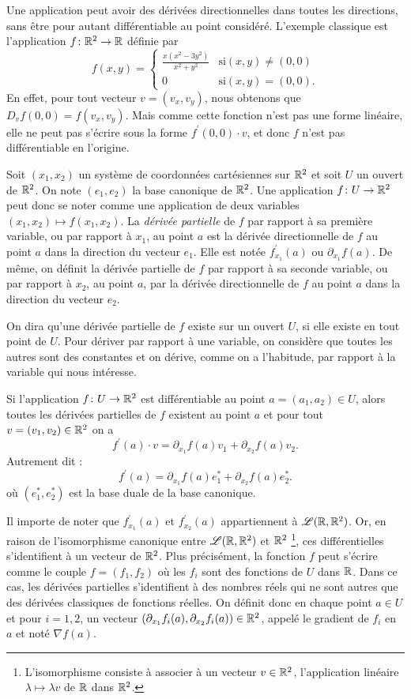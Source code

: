 Une application peut avoir des dérivées directionnelles dans toutes les directions, sans être pour autant différentiable au point considéré. L'exemple classique est l'application $f \colon \mathbb R^2 \to \mathbb R$ définie par
\[f(x,y) = \begin{cases} \frac{x(x^2-3 y^2)}{x^2 + y^2} & \text{si} (x,y) \neq (0,0) \\
0 &  \text{si} (x,y)= (0,0).
\end{cases}\]
En effet, pour tout vecteur $v=(v_x, v_y)$, nous obtenons que $D_v f(0,0) = f(v_x,v_y)$. Mais comme cette fonction n'est pas une forme linéaire, elle ne peut pas s'écrire sous la forme $f^\prime(0,0) \cdot v$, et donc $f$ n'est pas différentiable en l'origine. 

Soit $(x_1,x_2)$ un système de coordonnées cartésiennes sur $\mathbb R^2$ et soit $U$ un ouvert de $\mathbb R^2$. On note $(e_1, e_2)$ la base canonique de $\mathbb R^2$. Une application $f \colon U \to \mathbb R^2$ peut donc se noter comme une application de deux variables $(x_1,x_2) \mapsto f(x_1,x_2)$. La \textit{dérivée partielle} de $f$ par rapport à sa première variable, ou par rapport à $x_1$, au point $a$ est la dérivée directionnelle de $f$ au point $a$ dans la direction du vecteur $e_1$. Elle est notée  $f^\prime_{x_1} (a)$ ou $\partial_{x_1} f (a)$. De même, on définit la dérivée partielle de $f$ par rapport à sa seconde variable, ou par rapport à $x_2$, au point $a$, par la dérivée directionnelle de $f$ au point $a$ dans la direction du vecteur $e_2$. 

On dira qu'une dérivée partielle de $f$ existe sur un ouvert $U$, si elle existe en tout point de $U$. Pour dériver par rapport à une variable, on considère que toutes les autres sont des constantes et on dérive, comme on a l'habitude, par rapport à la variable qui nous intéresse.

\begin{prop}
Si l'application $f \colon U \to \mathbb R^2$ est différentiable au point $a=(a_1,a_2) \in U$, alors toutes les dérivées partielles de $f$ existent au point $a$ et pour tout $v = (v_1,v_2) \in \mathbb R^2$ on a
\[f^\prime (a) \cdot v = \partial_{x_1}f(a) v_1 + \partial_{x_2}f(a)v_2.\]
Autrement dit :
\[f^\prime (a) = \partial_{x_1}f(a) e^\ast_1 + \partial_{x_2}f(a)e^\ast_2.\]
où $(e_1^\ast, e_2^\ast)$ est la base duale de la base canonique. 
\end{prop}

Il importe de noter que $f^\prime_{x_1} (a)$ et $f^\prime_{x_2} (a)$ appartiennent à $\mathcal{L}(\mathbb R, \mathbb R^2)$. Or, en raison de l'isomorphisme canonique entre $\mathcal{L}(\mathbb R, \mathbb R^2)$ et $\mathbb R^2$ \footnote{L'isomorphisme consiste à associer à un vecteur $v \in \mathbb R^2$, l'application linéaire $\lambda \mapsto \lambda v$ de $\mathbb R$ dans $\mathbb R^2$.}, ces différentielles s'identifient à un vecteur de $\mathbb R^2$. Plus précisément, la fonction $f$ peut s'écrire comme le couple $f=(f_1,f_2)$ où les $f_i$ sont des fonctions de $U$ dans $\mathbb R$. Dans ce cas, les dérivées partielles s'identifient à des nombres réels qui ne sont autres que des dérivées classiques de fonctions réelles. On définit donc en chaque point $a \in U$ et pour $i=1,2$, un vecteur $(\partial_{x_1} f_i (a),\partial_{x_2} f_i (a)) \in \mathbb R^2$, appelé le gradient de $f_i$ en $a$ et noté $\nabla f(a)$.   

